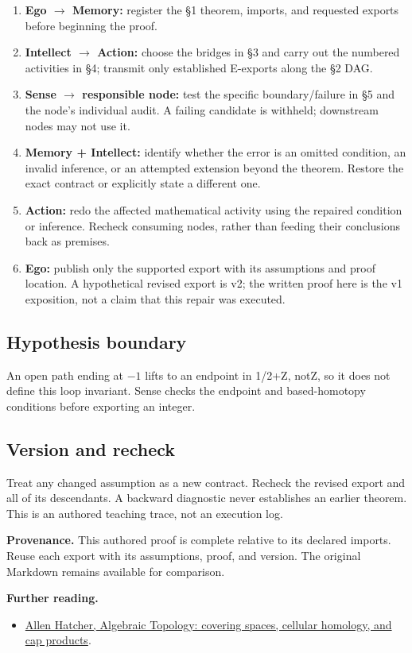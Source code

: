 \documentclass[preprint,12pt,aps,pra,showkeys,amsmath,amssymb,superscriptaddress,floatfix]{revtex4-2}
\theoremstyle{definition}
\theoremstyle{remark}
\providecommand{\tightlist}{\setlength{\itemsep}{2pt}\setlength{\parskip}{0pt}}
\begin{document}
\begin{enumerate}
\def\labelenumi{\arabic{enumi}.}
\tightlist
\item
  \textbf{Ego \(\to\) Memory:} register the §1 theorem, imports, and
  requested exports before beginning the proof.
\item
  \textbf{Intellect \(\to\) Action:} choose the bridges in §3 and carry
  out the numbered activities in §4; transmit only established E-exports
  along the §2 DAG.
\item
  \textbf{Sense \(\to\) responsible node:} test the specific
  boundary/failure in §5 and the node's individual audit. A failing
  candidate is withheld; downstream nodes may not use it.
\item
  \textbf{Memory + Intellect:} identify whether the error is an omitted
  condition, an invalid inference, or an attempted extension beyond the
  theorem. Restore the exact contract or explicitly state a different
  one.
\item
  \textbf{Action:} redo the affected mathematical activity using the
  repaired condition or inference. Recheck consuming nodes, rather than
  feeding their conclusions back as premises.
\item
  \textbf{Ego:} publish only the supported export with its assumptions
  and proof location. A hypothetical revised export is v2; the written
  proof here is the v1 exposition, not a claim that this repair was
  executed.
\end{enumerate}

\subsection{Hypothesis boundary}
An open path ending at \(-1\) lifts to an endpoint in 1/2+Z, notZ, so it
does not define this loop invariant. Sense checks the endpoint and
based-homotopy conditions before exporting an integer.

\subsection{Version and recheck}
Treat any changed assumption as a new contract. Recheck the revised
export and all of its descendants. A backward diagnostic never
establishes an earlier theorem. This is an authored teaching trace, not
an execution log.

\par\medskip\begingroup\small\linespread{1.0}\selectfont\noindent\textbf{Provenance.} This authored proof is complete relative to its declared imports. Reuse
each export with its assumptions, proof, and version. The original
Markdown remains available for comparison.
\par\endgroup

\par\smallskip\begingroup\small\linespread{1.0}\selectfont\noindent\textbf{Further reading.} \begin{itemize}
\tightlist
\item
  \href{https://pi.math.cornell.edu/~hatcher/AT/AT.pdf}{Allen Hatcher,
  Algebraic Topology: covering spaces, cellular homology, and cap
  products}.
\end{itemize}\par\endgroup
\end{document}
